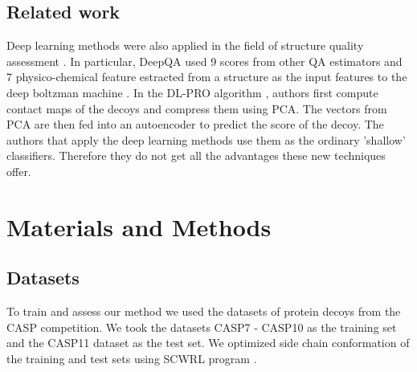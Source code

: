 \documentclass[a4paper,10pt]{article}
\begin{document}
\subsection{Related work}
Deep learning methods were also applied in the field of structure quality assessment \cite{}. In particular, 
DeepQA \cite{} used 9 scores from other QA estimators and 
7 physico-chemical feature estracted from a structure as the input features to the deep boltzman machine \cite{}. 
In the DL-PRO algorithm \cite{}, authors first compute contact maps of the decoys and compress them using PCA. 
The vectors from PCA are then fed into an autoencoder to predict the score of the decoy. 
The authors that apply the deep learning methods use them as the ordinary 'shallow' classifiers. 
Therefore they do not get all the advantages these new techniques offer.


\section{Materials and Methods}




\subsection{Datasets}
To train and assess our method we used the datasets of protein decoys from the CASP competition. 
We took the datasets CASP7 - CASP10 as the training set and the CASP11 dataset as the test set.
We optimized side chain conformation of the training and test sets using SCWRL program \cite{}.
\end{document}
